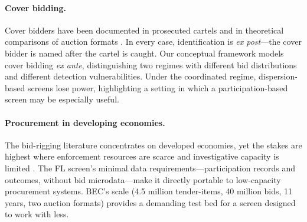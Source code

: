 \paragraph{Cover bidding.}
Cover bidders have been documented in prosecuted cartels
\citep{porter1999ohio, pesendorfer2000study, asker2010leniency,
marshall2012economics} and in theoretical comparisons of auction
formats \citep{athey2011comparing}. In every case, identification is
\emph{ex post}---the cover bidder is named after the cartel is
caught. Our conceptual framework models cover bidding \emph{ex ante},
distinguishing two regimes with different bid distributions and
different detection vulnerabilities. Under the coordinated regime,
dispersion-based screens lose power, highlighting a setting in which a
participation-based screen may be especially useful.

\paragraph{Procurement in developing economies.}
The bid-rigging literature concentrates on developed economies, yet
the stakes are highest where enforcement resources are scarce and
investigative capacity is limited
\citep{sanchezgraells2019screening}. The FL screen's minimal data
requirements---participation records and outcomes, without bid
microdata---make it directly portable to low-capacity procurement
systems. BEC's scale (4.5 million tender-items, 40 million bids,
11 years, two auction formats) provides a demanding test bed for a
screen designed to work with less.
